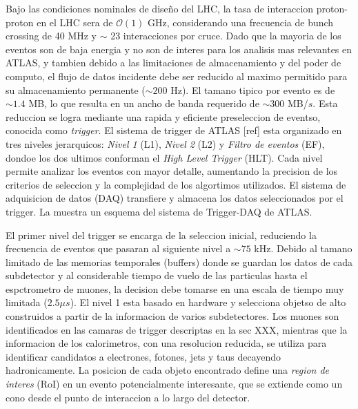 Bajo las condiciones nominales de dise\~no del LHC, la tasa de interaccion
proton-proton en el LHC sera de $\mathcal{O}(1)$ GHz, considerando una
frecuencia de bunch crossing de 40 MHz y $\sim$ 23 interacciones por cruce. Dado
que la mayoria de los eventos son de baja energia y no son de interes para los
analisis mas relevantes en ATLAS, y tambien debido a las limitaciones de
almacenamiento y del poder de computo, el flujo de datos incidente debe ser
reducido al maximo permitido para su almacenamiento permanente ($\sim 200$ Hz).
El tamano tipico por evento es de $\sim 1.4$ MB, lo que resulta en un ancho de
banda requerido de $\sim 300$ MB/$s$. Esta reduccion se logra mediante una
rapida y eficiente preseleccion de eventso, conocida como \emph{trigger}. El
sistema de trigger de ATLAS [ref] esta organizado en tres niveles jerarquicos:
\emph{Nivel 1} (L1), \emph{Nivel 2} (L2) y \emph{Filtro de eventos} (EF), dondoe
los dos ultimos conforman el \emph{High Level Trigger} (HLT). Cada nivel permite
analizar los eventos con mayor detalle, aumentando la precision de los criterios
de seleccion y la complejidad de los algortimos utilizados. El sistema de
adquisicion de datos (DAQ) transfiere y almacena los datos seleccionados por el
trigger. La {\fig} {\XXX} muestra un esquema del sistema de Trigger-DAQ de
ATLAS.

El primer nivel del trigger se encarga de la seleccion inicial, reduciendo la
frecuencia de eventos que pasaran al siguiente nivel a $\sim 75$ kHz. Debido al
tamano limitado de las memorias temporales (buffers) donde se guardan los datos
de cada subdetector y al considerable tiempo de vuelo de las particulas hasta el
espctrometro de muones, la decision debe tomarse en una escala de tiempo muy
limitada ($2.5 \mu s$). El nivel 1 esta basado en hardware y selecciona objetso
de alto {\pt} construidos a partir de la informacion de varios subdetectores.
Los muones son identificados en las camaras de trigger descriptas en la sec XXX,
mientras que la informacion de los calorimetros, con una resolucion reducida, se
utiliza para identificar candidatos a electrones, fotones, jets y taus decayendo
hadronicamente. La posicion de cada objeto encontrado define una \emph{region de
  interes} (RoI) en un evento potencialmente interesante, que se extiende como
un cono desde el punto de interaccion a lo largo del detector.

